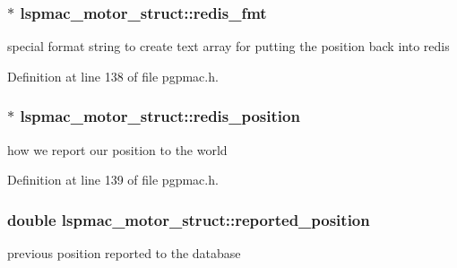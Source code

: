 \hypertarget{structlspmac__motor__struct_a91c38b2072d878b71f4e77de2f1375a4}{
\subsubsection[{redis\-\_\-fmt}]{$\ast$ lspmac\-\_\-motor\-\_\-struct\-::redis\-\_\-fmt}}\label{structlspmac__motor__struct_a91c38b2072d878b71f4e77de2f1375a4}


special format string to create text array for putting the position back into redis 



Definition at line 138 of file pgpmac.\-h.

\hypertarget{structlspmac__motor__struct_af94a0b2611136058ead4948fd7c858e3}{
\subsubsection[{redis\-\_\-position}]{$\ast$ lspmac\-\_\-motor\-\_\-struct\-::redis\-\_\-position}}\label{structlspmac__motor__struct_af94a0b2611136058ead4948fd7c858e3}


how we report our position to the world 



Definition at line 139 of file pgpmac.\-h.

\hypertarget{structlspmac__motor__struct_ae5f1f605a0f587500e627332ad4e5e7e}{
\subsubsection[{reported\-\_\-position}]{\setlength{\rightskip}{0pt plus 5cm}double lspmac\-\_\-motor\-\_\-struct\-::reported\-\_\-position}}\label{structlspmac__motor__struct_ae5f1f605a0f587500e627332ad4e5e7e}


previous position reported to the database 



